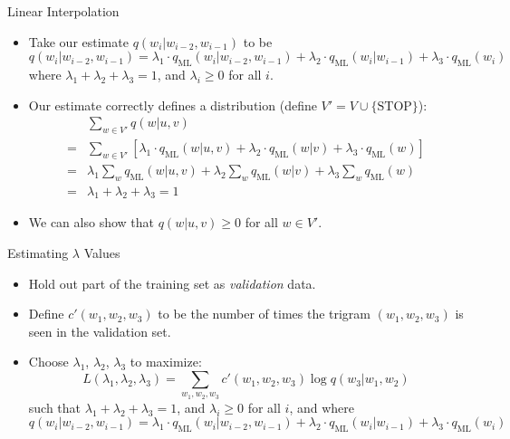 \documentclass[10pt]{beamer}
\begin{document}
\begin{frame}{Linear Interpolation}
    \scriptsize
    \begin{itemize}
     \item Take our estimate $q(w_i | w_{i-2}, w_{i-1})$ to be
    \[
    q(w_i | w_{i-2}, w_{i-1}) = \lambda_1 \cdot q_{\text{ML}}(w_i | w_{i-2}, w_{i-1}) + \lambda_2 \cdot q_{\text{ML}}(w_i | w_{i-1}) + \lambda_3 \cdot q_{\text{ML}}(w_i)
    \]
    where $\lambda_1 + \lambda_2 + \lambda_3 = 1$, and $\lambda_i \geq 0$ for all $i$.
    
    \item Our estimate correctly defines a distribution (define $V' = V \cup \{\text{STOP}\}$):
    \[
    \begin{aligned}
        & \sum_{w \in V'} q(w | u, v) \\
        = & \sum_{w \in V'} [\lambda_1 \cdot q_{\text{ML}}(w | u, v) + \lambda_2 \cdot q_{\text{ML}}(w | v) + \lambda_3 \cdot q_{\text{ML}}(w)] \\
        = & \lambda_1 \sum_{w} q_{\text{ML}}(w | u, v) + \lambda_2 \sum_{w} q_{\text{ML}}(w | v) + \lambda_3 \sum_{w} q_{\text{ML}}(w) \\
        = & \lambda_1 + \lambda_2 + \lambda_3 = 1
    \end{aligned}
    \]
    \item We can also show that $q(w | u, v) \geq 0$ for all $w \in V'$.
    \end{itemize}

    
    
\end{frame}

\begin{frame}{Estimating $\lambda$ Values}
\scriptsize
\begin{itemize}
  \item Hold out part of the training set as \textit{validation} data.
  \item Define $c'(w_1, w_2, w_3)$ to be the number of times the trigram $(w_1, w_2, w_3)$ is seen in the validation set.
  \item Choose $\lambda_1$, $\lambda_2$, $\lambda_3$ to maximize:
  \[
  L(\lambda_1, \lambda_2, \lambda_3) = \sum_{w_1,w_2,w_3} c'(w_1, w_2, w_3) \log q(w_3 | w_1, w_2)
  \]
  such that $\lambda_1 + \lambda_2 + \lambda_3 = 1$, and $\lambda_i \geq 0$ for all $i$, and where
  \[
  q(w_i | w_{i-2}, w_{i-1}) = \lambda_1 \cdot q_{\text{ML}}(w_i | w_{i-2}, w_{i-1}) + \lambda_2 \cdot q_{\text{ML}}(w_i | w_{i-1}) + \lambda_3 \cdot q_{\text{ML}}(w_i)
  \]
\end{itemize}
\end{frame}
\end{document}

